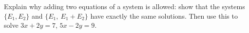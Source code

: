 Explain why adding two equations of a system is allowed: show that the systems $\{E_1,E_2\}$ and $\{E_1,\ E_1+E_2\}$ have exactly the same solutions. Then use this to solve $3x+2y=7$, $5x-2y=9$.
